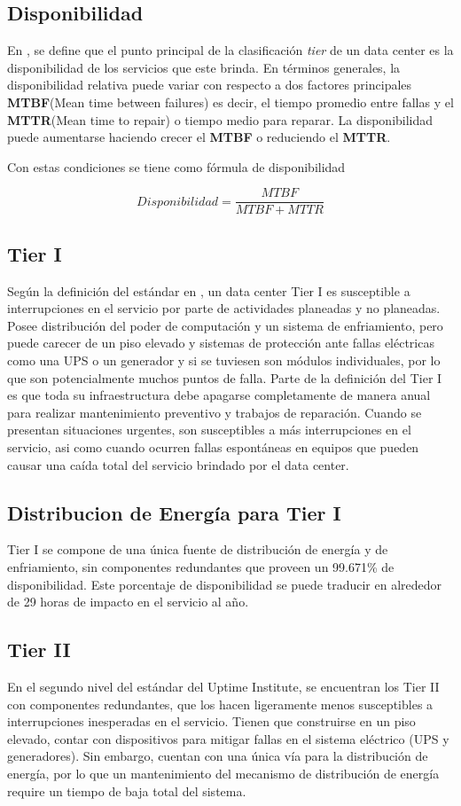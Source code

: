 \documentclass[journal]{IEEEtran}
\begin{document}
\subsection{Disponibilidad}
En \cite{power_2019}, se define que el punto principal de la clasificación \emph{tier} de un data center es la disponibilidad de los servicios que este brinda.
En términos generales, la disponibilidad relativa puede variar con respecto a dos factores principales \textbf{MTBF}(Mean time between failures) es decir, el tiempo promedio entre fallas y
el \textbf{MTTR}(Mean time to repair) o tiempo medio para reparar.
La disponibilidad puede aumentarse haciendo crecer el \textbf{MTBF} o reduciendo  el \textbf{MTTR}.

Con estas condiciones se tiene como fórmula  de disponibilidad

\[Disponibilidad = \frac{MTBF}{MTBF+MTTR} \]

\subsection{Tier I}
Según la definición del estándar en \cite{pitt_turner}, un data center Tier I es susceptible a interrupciones en el servicio por parte de actividades  planeadas y no planeadas.
Posee distribución del poder de computación y un sistema de enfriamiento, pero puede carecer de un piso elevado y sistemas de protección ante fallas 
eléctricas como una UPS o un generador y si se tuviesen son módulos individuales, por lo que son potencialmente muchos puntos de falla.
Parte de la definición del Tier I es que toda su infraestructura debe apagarse completamente de manera anual para realizar mantenimiento preventivo y trabajos de reparación.
Cuando se presentan situaciones urgentes, son susceptibles a más interrupciones en el servicio, asi  como cuando ocurren fallas espontáneas en equipos que pueden causar una caída total del servicio brindado por el data center.
\subsection{Distribucion de Energía para Tier I}
Tier I se compone de una única fuente de distribución de energía y de enfriamiento, sin componentes redundantes que proveen un 99.671\% de disponibilidad\cite{pitt_turner}.
Este porcentaje de disponibilidad se puede traducir en alrededor de 29 horas de impacto en el servicio al año.
\subsection{Tier II}
En el segundo nivel del estándar del Uptime Institute, se encuentran los Tier II con componentes redundantes, que los hacen ligeramente menos susceptibles a interrupciones inesperadas en el servicio.
Tienen que construirse en un piso elevado, contar con dispositivos para mitigar fallas en el sistema eléctrico (UPS y generadores). Sin embargo, cuentan con una única vía para la distribución de energía,
por lo que un mantenimiento del mecanismo de distribución de energía require un tiempo de baja total del sistema.
\end{document}
